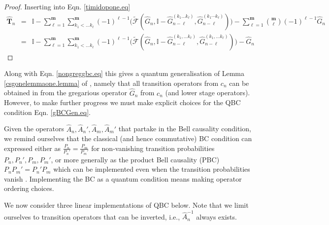 \documentclass[11pt]{article}
\newcommand{\hG}{\hat G}
\newcommand{\hhT}{\hat A}
\newcommand{\hTi}{\widehat{\mathbf{T}}}
\newcommand{\bmm}{{\mathbf m}}
\newcommand{\id}{\mathbb I}
\newcommand{\h}{\hat}
\begin{document}
\begin{proof}
Inserting into Eqn. \eqref{timidopone.eq}
  \begin{eqnarray}
\hTi_n&=&\id-\sum_{\ell =1}^\bmm \sum_{k_1<\ldots k_\ell }^\bmm
    (-1)^{\ell
    -1}\biggl(\tilde{\mathcal{F}}(\hG_n,\id-\hG_{n-\ell}^{(k_1\ldots
    k_\ell )}  ,\hG_{n-\ell}^{(k_1\cdots k_\ell )})\biggr)
    -\sum_{\ell=1}^\bmm \binom{\bmm}{\ell} 
    (-1)^{\ell -1}  \hG_n \nonumber\\
&=&\mathbb{I}-\sum_{\ell=1}^\bmm\sum_{k_1<\ldots k_\ell }^\bmm
    (-1)^{\ell
    -1}\biggl(\tilde{\mathcal{F}}(\hG_n,\id-\hG_{n-\ell}^{(k_1,\ldots
    k_\ell )}  ,\hG_{n-\ell}^{(k_1, \ldots k_\ell )})\biggr) -\hG_n \label{timid.eq}
\end{eqnarray}

\end{proof}

Along with Eqn. \eqref{nongreggbc.eq}  this gives  a quantum
generalisation of  Lemma \ref{csgonelemmaone.lemma} of \cite{csgone},
namely that all transition operators  from $c_n$ can be obtained in
from the gregarious operator $\h G_n$ from $c_n$ (and lower
stage operators). However, to make 
further progress we must make  explicit choices for the QBC condition Eqn. \eqref{gBCGen.eq}.  


Given the operators $\hhT_n,\hhT_n',\hhT_m,\hhT_m'$ that partake in
the Bell causality condition, we remind ourselves that  the
classical (and hence 
commutative) BC condition can expressed either as  $\frac{P_n}{P_n'}= \frac{P_m}{P_m'}$
for non-vanishing transition probabilities $P_n,P_n', P_m, P_m'$, or more generally as the
product Bell causality (PBC) \cite{dsobs} $  P_n P_m' = P_n' P_m $
which can be implemented even when the transition probabilities vanish
\cite{rv,dsobs}. Implementing the BC  as a quantum condition means making operator 
ordering choices. 


We now consider  three linear
implementations of QBC below.  Note that we  limit ourselves to transition
operators that can be inverted, i.e., $\hhT_n^{-1}$ always exists.  
   
\end{document}
